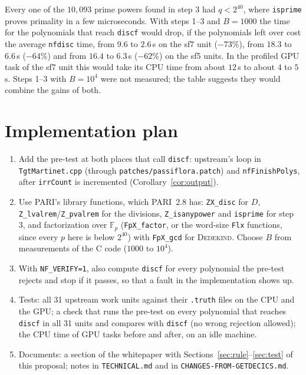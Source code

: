 \documentclass[10pt,a4paper]{article}
\newcommand{\Fp}{\mathbb{F}_p}
\newcommand{\code}[1]{\texttt{#1}}
\theoremstyle{plain}
\theoremstyle{definition}
\begin{document}
\noindent Every one of the $10{,}093$ prime powers found in step 3 had $q<2^{40}$, where \code{isprime} proves primality in a few
microseconds.  With steps 1--3 and $B=1000$ the time for the polynomials that reach \code{discf} would drop, if the polynomials left
over cost the average \code{nfdisc} time, from $9.6$ to $2.6$\,s on the sf7 unit ($-73$\%), from $18.3$ to $6.6$\,s ($-64$\%) and from
$16.4$ to $6.3$\,s ($-62$\%) on the sf5 units.  In the profiled GPU task of the sf7 unit this would take its CPU time from about
$12$\,s to about $4$ to $5$\,s.  Steps 1--3 with $B=10^4$ were not measured; the table suggests they would combine the gains of both.

\section{Implementation plan}\label{sec:plan}

\begin{enumerate}[nosep,label=\arabic*.]
\item Add the pre-test at both places that call \code{discf}: upstream's loop in \code{TgtMartinet.cpp} (through
  \code{patches/passiflora.patch}) and \code{nfFinishPolys}, after \code{irrCount} is incremented (Corollary~\ref{cor:output}).
\item Use PARI's library functions, which PARI~2.8 has: \code{ZX\_disc} for $D$, \code{Z\_lvalrem}/\code{Z\_pvalrem} for the
  divisions, \code{Z\_isanypower} and \code{isprime} for step 3, and factorization over $\Fp$ (\code{FpX\_factor}, or the word-size
  \code{Flx} functions, since every $p$ here is below $2^{40}$) with \code{FpX\_gcd} for \textsc{Dedekind}.  Choose $B$ from
  measurements of the C code ($1000$ to $10^4$).
\item With \code{NF\_VERIFY=1}, also compute \code{discf} for every polynomial the pre-test rejects and stop if it passes, so that a
  fault in the implementation shows up.
\item Tests: all 31 upstream work units against their \code{.truth} files on the CPU and the GPU; a check that runs the pre-test on
  every polynomial that reaches \code{discf} in all 31 units and compares with \code{discf} (no wrong rejection allowed); the CPU time
  of GPU tasks before and after, on an idle machine.
\item Documents: a section of the whitepaper with Sections~\ref{sec:rule}--\ref{sec:test} of this proposal; notes in
  \code{TECHNICAL.md} and in \code{CHANGES-FROM-GETDECICS.md}.
\end{enumerate}
\end{document}
